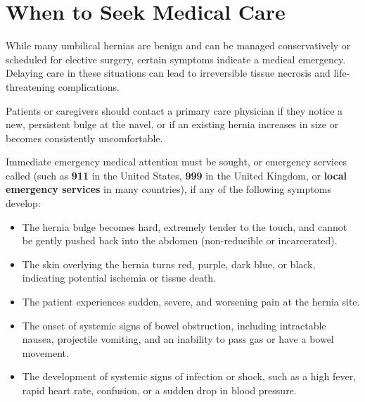 \section*{When to Seek Medical Care}
While many umbilical hernias are benign and can be managed conservatively or scheduled for elective surgery, certain symptoms indicate a medical emergency. Delaying care in these situations can lead to irreversible tissue necrosis and life-threatening complications.

Patients or caregivers should contact a primary care physician if they notice a new, persistent bulge at the navel, or if an existing hernia increases in size or becomes consistently uncomfortable.

Immediate emergency medical attention must be sought, or emergency services called (such as \textbf{911} in the United States, \textbf{999} in the United Kingdom, or \textbf{local emergency services} in many countries), if any of the following symptoms develop:
\begin{itemize}
    \item The hernia bulge becomes hard, extremely tender to the touch, and cannot be gently pushed back into the abdomen (non-reducible or incarcerated).
    \item The skin overlying the hernia turns red, purple, dark blue, or black, indicating potential ischemia or tissue death.
    \item The patient experiences sudden, severe, and worsening pain at the hernia site.
    \item The onset of systemic signs of bowel obstruction, including intractable nausea, projectile vomiting, and an inability to pass gas or have a bowel movement.
    \item The development of systemic signs of infection or shock, such as a high fever, rapid heart rate, confusion, or a sudden drop in blood pressure.
\end{itemize}

